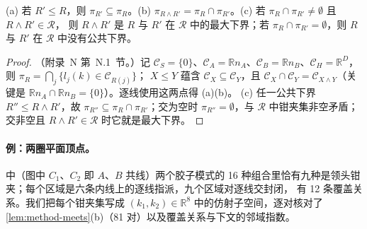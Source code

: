 \begin{lemma}[逐线交与钳夹集的交]\label{lem:method-meets}
(a) 若 $R'\le R$，则 $\pi_{R'}\subseteq\pi_R$。(b) $\pi_{R\wedge R'}=\pi_R\cap\pi_{R'}$。(c) 若 $\pi_R\cap\pi_{R'}\neq\emptyset$ 且 $R\wedge R'\in\mathcal R$，
则 $R\wedge R'$ 是 $R$ 与 $R'$ 在 $\mathcal R$ 中的最大下界；若 $\pi_R\cap\pi_{R'}=\emptyset$，则 $R$ 与 $R'$ 在 $\mathcal R$ 中没有公共下界。
\end{lemma}

\begin{proof}
（附录~N 第~N.1~节。）记 $\mathcal C_S=\{0\}$、$\mathcal C_A=\mathbb Rn_A$、$\mathcal C_B=\mathbb Rn_B$、$\mathcal C_H=\mathbb R^D$，则 $\pi_R=\bigcap_j\{l_j(k)\in\mathcal C_{R(j)}\}$；
$X\le Y$ 蕴含 $\mathcal C_X\subseteq\mathcal C_Y$，且 $\mathcal C_X\cap\mathcal C_Y=\mathcal C_{X\wedge Y}$（关键是 $\mathbb Rn_A\cap\mathbb Rn_B=\{0\}$）。逐线使用这两点得 (a)(b)。
(c) 任一公共下界 $R''\le R\wedge R'$，故 $\pi_{R''}\subseteq\pi_R\cap\pi_{R'}$；交为空时 $\pi_{R''}=\emptyset$，与 $\mathcal R$ 中钳夹集非空矛盾；交非空且 $R\wedge R'\in\mathcal R$ 时它就是最大下界。
\end{proof}

\paragraph{例：两圈平面顶点。}中（图中 $C_1$、$C_2$ 即 $A$、$B$ 共线）两个胶子模式的 16 种组合里恰有九种是领头钳夹；每个区域是六条内线上的逐线指派，九个区域对逐线交封闭，
有 12 条覆盖关系。我们把每个钳夹集写成 $(k_1,k_2)\in\mathbb R^8$ 中的仿射子空间，逐对核对了\cref{lem:method-meets}(b)（81 对）以及覆盖关系与下文的邻域指数。%

